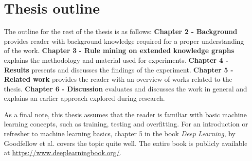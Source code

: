 \section{Thesis outline}
The outline for the rest of the thesis is as follows: \newline \newline
\textbf{Chapter 2 - Background} provides reader with background knowledge required for a proper understanding of the work. \newline
\newline
\textbf{Chapter 3 - Rule mining on extended knowledge graphs} explains the methodology and material used for experiments. \newline
\newline
\textbf{Chapter 4 - Results} presents and discusses the findings of the experiment. \newline \newline
\textbf{Chapter 5 - Related work} provides the reader with an overview of works related to the thesis. \newline \newline
\textbf{Chapter 6 - Discussion} evaluates and discusses the work in general and explains an earlier approach explored during research.
\newline \newline

As a final note, this thesis assumes that the reader is familiar with basic machine learning concepts, such as training, testing and overfitting. For an introduction or refresher to machine learning basics, chapter 5 in the book \textit{Deep Learning}, by Goodfellow et al. \cite{goodfellow} covers the topic quite well. The entire book is publicly available at \href{https://www.deeplearningbook.org/}{https://www.deeplearningbook.org/}.